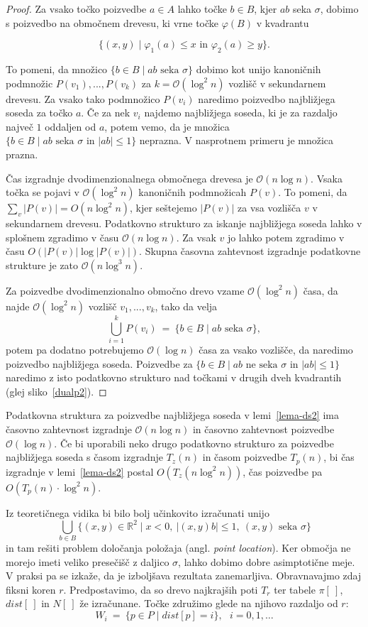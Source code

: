 \documentclass[a4paper, 12pt]{book}
\newcommand{\RR}{\ensuremath{\mathbb R}}  %
\newcommand{\OO}{\ensuremath{\mathcal{O}}} %
\def\dist{\mathit{dist}}
\begin{document}
\begin{proof}
Za vsako točko poizvedbe $a \in A$ lahko točke $b \in B$, kjer $ab$ seka $\sigma$, dobimo s poizvedbo na območnem drevesu, ki vrne točke $\varphi(B)$ v kvadrantu

\[
		\{(x,y)\mid  \varphi_1(a) \leq x \text{ in } \varphi_2(a) \geq y\}.
	\]

To pomeni, da množico $\{ b\in B \mid \text{$ab$ seka $\sigma$}\}$ dobimo kot unijo kanoničnih podmnožic $P(v_1),...,P(v_k)$ za $k = \OO(\log^2n)$ vozlišč v sekundarnem drevesu. Za vsako tako podmnožico $P(v_i)$ naredimo poizvedbo najbližjega soseda za točko $a$. Če za nek $v_i$ najdemo najbližjega soseda, ki je za razdaljo največ $1$ oddaljen od $a$, potem vemo, da je množica $\{ b\in B \mid \text{$ab$ seka $\sigma$ in $|ab|\le 1$}\}$ neprazna. V nasprotnem primeru je množica prazna.

Čas izgradnje dvodimenzionalnega območnega drevesa je $\OO(n\log n)$. Vsaka točka se pojavi v $\OO(\log^2n)$ kanoničnih podmnožicah $P(v)$. To pomeni, da $\sum_v |P(v)| = O( n\log^2 n)$, kjer seštejemo $|P(v)|$ za vsa vozlišča $v$ v sekundarnem drevesu. Podatkovno strukturo za iskanje najbližjega soseda lahko v splošnem zgradimo v času $\OO(n\log n)$. Za vsak $v$ jo lahko potem zgradimo v času $O(|P(v)| \log |P(v)|)$. Skupna časovna zahtevnost izgradnje podatkovne strukture je zato $\OO(n\log^3n)$.

Za poizvedbe dvodimenzionalno območno drevo vzame $\OO(\log^2n)$ časa, da  najde $\OO(\log^2n)$ vozlišč $v_1,...,v_k$, tako da velja
\[
		\bigcup_{i=1}^k P(v_i) ~=~ \{ b\in B \mid \text{$ab$ seka $\sigma$}\},
\]
potem pa dodatno potrebujemo $\OO(\log n)$ časa za vsako vozlišče, da naredimo poizvedbo najbližjega soseda. Poizvedbe za $\{ b\in B \mid \text{$ab$ ne seka $\sigma$ in $|ab|\le 1$}\}$ naredimo z isto podatkovno strukturo nad točkami v drugih dveh kvadrantih (glej sliko~\ref{dualp2}).
\end{proof}

Podatkovna struktura za poizvedbe najbližjega soseda v lemi~\ref{lema-ds2} ima časovno zahtevnost izgradnje $\OO(n\log n)$ in časovno zahtevnost poizvedbe $\OO(\log n)$. Če bi uporabili neko drugo podatkovno strukturo za poizvedbe najbližjega soseda s časom izgradnje $T_z(n)$ in časom poizvedbe $T_p(n)$, bi čas izgradnje v lemi~\ref{lema-ds2} postal $O(T_z(n\log^2 n))$, čas poizvedbe pa $O(T_p(n)\cdot \log^2 n)$.

Iz teoretičnega vidika bi bilo bolj učinkovito izračunati unijo
\[
	\bigcup_{b\in B} \{ (x,y)\in \RR^2\mid x<0,~ |(x,y)b|\le 1,~ (x,y) 
			\text{ seka } \sigma \}
\]
in tam rešiti problem določanja položaja (angl. \textit{point location}). Ker območja ne morejo imeti veliko presečišč z daljico $\sigma$, lahko dobimo dobre asimptotične meje. V praksi pa se izkaže, da je izboljšava rezultata zanemarljiva.
\bigbreak
Obravnavajmo zdaj fiksni koren $r$. Predpostavimo, da so drevo najkrajših poti $T_r$ ter tabele $\pi[~]$, $\dist[~]$ in $N[~]$ že izračunane. Točke združimo glede na njihovo razdaljo od $r$:
\[
	W_i ~=~ \{ p\in P \mid \dist[p]=i \},~~~ i=0,1,\dots
\]
\end{document}
